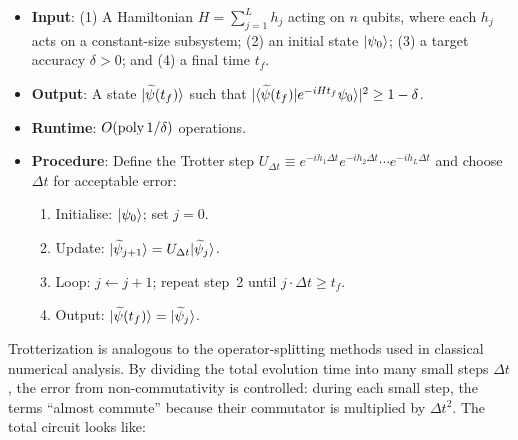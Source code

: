 \begin{algorithmbox}
  \begin{itemize}
    \item \textbf{Input}: (1) A Hamiltonian $H = \sum_{j=1}^L h_j$ acting
      on $n$ qubits, where each $h_j$ acts on a constant-size subsystem;
      (2) an initial state $|\psi_0\rangle$; (3) a target accuracy $\delta>0$;
      and (4) a final time $t_f$.
    \item \textbf{Output}: A state $|\widetilde{\psi}(t_f)\rangle$ such that
      $|\langle\widetilde{\psi}(t_f)|e^{-iHt_f}\psi_0\rangle|^2 \ge 1-\delta$.
    \item \textbf{Runtime}: $O\!\left(\operatorname{poly}{1/\delta}\right)$ operations.
    \item \textbf{Procedure}: Define the Trotter step
      $U_{\Delta t} \equiv e^{-i h_1\Delta t}e^{-i h_2\Delta t}
      \cdots e^{-i h_L\Delta t}$ and choose $\Delta t$ for acceptable error:
      \begin{enumerate}
        \item Initialise: $|\psi_0\rangle$; set $j=0$.
        \item Update: $|\widetilde{\psi}_{j+1}\rangle
          = U_{\Delta t}|\widetilde{\psi}_{j}\rangle$.
        \item Loop: $j \leftarrow j+1$; repeat step~2 until
          $j\cdot\Delta t \ge t_f$.
        \item Output: $|\widetilde{\psi}(t_f)\rangle
          =|\widetilde{\psi}_{j}\rangle$.
      \end{enumerate}
  \end{itemize}
\end{algorithmbox}

\begin{intuition}
  Trotterization is analogous to the operator-splitting methods used in
  classical numerical analysis.  By dividing the total evolution time into
  many small steps $\Delta t$, the error from non-commutativity is controlled:
  during each small step, the terms ``almost commute'' because their
  commutator is multiplied by $\Delta t^2$.  The total circuit looks like:

  \begin{center}
  \end{center}
\end{intuition}


